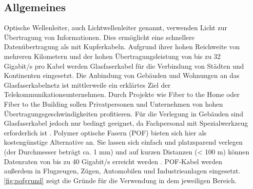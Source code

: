 \subsection{Allgemeines}
\label{subsec:pofallgemeines}

Optische Wellenleiter, auch Lichtwellenleiter genannt, verwenden Licht zur
Übertragung von Informationen. Dies ermöglicht eine schnellere Datenübertragung
als mit Kupferkabeln. Aufgrund ihrer hohen Reichweite von mehreren Kilometern
und der hohen Übertragungsleistung von bis zu 32 Gigabit/s pro Kabel werden
Glasfaserkabel für die Verbindung von Städten und Kontinenten eingesetzt. Die
Anbindung von Gebäuden und Wohnungen an das Glasfaserkabelnetz ist mittlerweile
ein erklärtes Ziel der Telekommunikationsunternehmen. Durch Projekte wie \glqq
Fiber to the Home\grqq{} oder \glqq Fiber to the Building\grqq{} sollen
Privatpersonen und Unternehmen von hohen Übertragungsgeschwindigkeiten
profitieren. Für die Verlegung in Gebäuden sind Glasfaserkabel jedoch nur
bedingt geeignet, da Fachpersonal mit Spezialwerkzeug erforderlich ist
\cite{poflan}. Polymer optische Fasern (POF) bieten sich hier als kostengünstige
Alternative an. Sie lassen sich einfach und platzsparend verlegen (der
Durchmesser beträgt ca. 1 mm) und auf kurzen Distanzen (< 100 m) können
Datenraten von bis zu 40 Gigabit/s \cite{pofacgif} erreicht werden
\cite{pofacprofile}. POF-Kabel werden außerdem in Flugzeugen, Zügen, Automobilen
und Industrieanlagen eingesetzt. \autoref{fig:pofgrund} zeigt die Gründe für die
Verwendung in dem jeweiligen Bereich.

